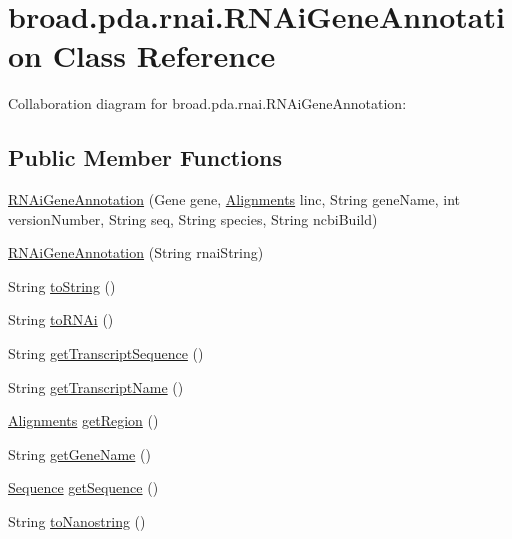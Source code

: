 \hypertarget{classbroad_1_1pda_1_1rnai_1_1_r_n_ai_gene_annotation}{\section{broad.\+pda.\+rnai.\+R\+N\+Ai\+Gene\+Annotation Class Reference}
\label{classbroad_1_1pda_1_1rnai_1_1_r_n_ai_gene_annotation}
}


Collaboration diagram for broad.\+pda.\+rnai.\+R\+N\+Ai\+Gene\+Annotation\+:
\subsection*{Public Member Functions}
\begin{DoxyCompactItemize}
\item 
\hyperlink{classbroad_1_1pda_1_1rnai_1_1_r_n_ai_gene_annotation_a84325bab55153c957c7456d9d10ea55f}{R\+N\+Ai\+Gene\+Annotation} (Gene gene, \hyperlink{classbroad_1_1pda_1_1datastructures_1_1_alignments}{Alignments} linc, String gene\+Name, int version\+Number, String seq, String species, String ncbi\+Build)
\item 
\hyperlink{classbroad_1_1pda_1_1rnai_1_1_r_n_ai_gene_annotation_ab7b2390bd83b2e590d8d4b990ac88665}{R\+N\+Ai\+Gene\+Annotation} (String rnai\+String)
\item 
String \hyperlink{classbroad_1_1pda_1_1rnai_1_1_r_n_ai_gene_annotation_a59f07af825c0abe331fce5003a615d8e}{to\+String} ()
\item 
String \hyperlink{classbroad_1_1pda_1_1rnai_1_1_r_n_ai_gene_annotation_ab65a6a0b3e97a8b3603544074da5ff21}{to\+R\+N\+Ai} ()
\item 
String \hyperlink{classbroad_1_1pda_1_1rnai_1_1_r_n_ai_gene_annotation_a448603290312af2544d88d28fa60a7fe}{get\+Transcript\+Sequence} ()
\item 
String \hyperlink{classbroad_1_1pda_1_1rnai_1_1_r_n_ai_gene_annotation_a6a3926492ca39c3fe5e12a1857766642}{get\+Transcript\+Name} ()
\item 
\hyperlink{classbroad_1_1pda_1_1datastructures_1_1_alignments}{Alignments} \hyperlink{classbroad_1_1pda_1_1rnai_1_1_r_n_ai_gene_annotation_a10dc03049c54ea74b351497700177f98}{get\+Region} ()
\item 
String \hyperlink{classbroad_1_1pda_1_1rnai_1_1_r_n_ai_gene_annotation_ade4f0313595a5bddf0fef019788a8185}{get\+Gene\+Name} ()
\item 
\hyperlink{classbroad_1_1core_1_1sequence_1_1_sequence}{Sequence} \hyperlink{classbroad_1_1pda_1_1rnai_1_1_r_n_ai_gene_annotation_a74d1b76c153f85b5311dff362966a5fc}{get\+Sequence} ()
\item 
String \hyperlink{classbroad_1_1pda_1_1rnai_1_1_r_n_ai_gene_annotation_a2bec70e564782ee26a44392ba1fb5448}{to\+Nanostring} ()
\end{DoxyCompactItemize}
